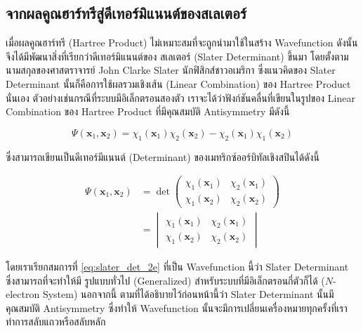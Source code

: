 \subsection{จากผลคูณฮาร์ทรีสู่ดีเทอร์มิแนนต์ของสเลเตอร์}
\label{ssec:hartree_prod_to_slater_deter}

เมื่อผลคูณฮาร์ทรี (Hartree Product) ไม่เหมาะสมที่จะถูกนำมาใช้ในสร้าง Wavefunction ดังนั้นจึงได้มีพัฒนาสิ่งที่เรียกว่าดีเทอร์มิแนนต์ของ%
สเลเตอร์ (Slater Determinant) ขึ้นมา โดยตั้งตามนามสกุลของศาสตราจารย์ John Clarke Slater นักฟิสิกส์ชาวอเมริกา ซึ่งแนวคิดของ
Slater Determinant นั้นก็คือการใช้ผลรวมเชิงเส้น (Linear Combination) ของ Hartree Product นั่นเอง\autocite{slater1929} 
ตัวอย่างเช่นกรณีที่ระบบมีอิเล็กตรอนสองตัว เราจะได้ว่าฟังก์ชันคลื่นที่เขียนในรูปของ Linear Combination ของ Hartree Product ที่มีคุณสมบัติ 
Antisymmetry มีดังนี้

\begin{equation}\label{eq:lin_com_hartree_prod}
    \Psi(\bm{x}_{1}, \bm{x}_{2}) = \chi_{1}(\bm{x}_{1})\chi_{2}(\bm{x}_{2}) - 
    \chi_{2}(\bm{x}_{1})\chi_{1}(\bm{x}_{2})
\end{equation}

\noindent ซึ่งสามารถเขียนเป็นดีเทอร์มีแนนต์ (Determinant) ของเมทริกซ์ออร์บิทัลเชิงสปินได้ดังนี้

\begin{align}\label{eq:slater_det_2e}
    \Psi(\bm{x}_{1}, \bm{x}_{2}) &= 
    \det \begin{pmatrix}
        \chi_{1}(\bm{x}_{1}) & \chi_{2}(\bm{x}_{1}) \\
        \chi_{1}(\bm{x}_{2}) & \chi_{2}(\bm{x}_{2})
    \end{pmatrix} \nonumber \\
    &= \begin{vmatrix}
        \chi_{1}(\bm{x}_{1}) & \chi_{2}(\bm{x}_{1}) \\
        \chi_{1}(\bm{x}_{2}) & \chi_{2}(\bm{x}_{2})
    \end{vmatrix}
\end{align}

\noindent โดยเราเรียกสมการที่ \ref{eq:slater_det_2e} ที่เป็น Wavefunction นี้ว่า Slater Determinant ซึ่งสามารถที่จะทำให้มี%
รูปแบบทั่วไป (Generalized) สำหรับระบบที่มีอิเล็กตรอนกี่ตัวก็ได้ ($N$-electron System) นอกจากนี้ ตามที่ได้อธิบายไว้ก่อนหน้านี้ว่า Slater 
Determinant นั้นมีคุณสมบัติ Antisymmetry ซึ่งทำให้ Wavefunction นั้นจะมีการเปลี่ยนเครื่องหมายทุกครั้งที่เราทำการสลับแถวหรือสลับหลัก

